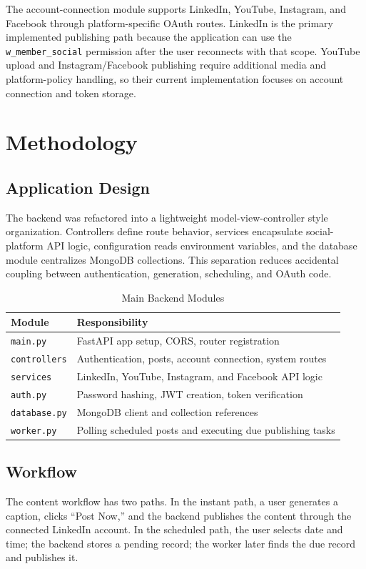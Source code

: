\documentclass[conference]{IEEEtran}
\begin{document}
The account-connection module supports LinkedIn, YouTube, Instagram, and Facebook through platform-specific OAuth routes. LinkedIn is the primary implemented publishing path because the application can use the \texttt{w\_member\_social} permission after the user reconnects with that scope. YouTube upload and Instagram/Facebook publishing require additional media and platform-policy handling, so their current implementation focuses on account connection and token storage.

\section{Methodology}
\subsection{Application Design}
The backend was refactored into a lightweight model-view-controller style organization. Controllers define route behavior, services encapsulate social-platform API logic, configuration reads environment variables, and the database module centralizes MongoDB collections. This separation reduces accidental coupling between authentication, generation, scheduling, and OAuth code.

\begin{table}[!t]
\centering
\caption{Main Backend Modules}
\label{tab:modules}
\begin{tabular}{p{2.5cm}p{5.2cm}}
\toprule
\textbf{Module} & \textbf{Responsibility}\\
\midrule
\texttt{main.py} & FastAPI app setup, CORS, router registration\\
\texttt{controllers} & Authentication, posts, account connection, system routes\\
\texttt{services} & LinkedIn, YouTube, Instagram, and Facebook API logic\\
\texttt{auth.py} & Password hashing, JWT creation, token verification\\
\texttt{database.py} & MongoDB client and collection references\\
\texttt{worker.py} & Polling scheduled posts and executing due publishing tasks\\
\bottomrule
\end{tabular}
\end{table}

\subsection{Workflow}
The content workflow has two paths. In the instant path, a user generates a caption, clicks ``Post Now,'' and the backend publishes the content through the connected LinkedIn account. In the scheduled path, the user selects date and time; the backend stores a pending record; the worker later finds the due record and publishes it.
\end{document}
